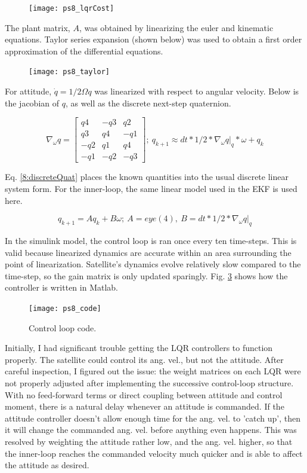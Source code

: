 \documentclass[12pt, letterpaper]{article}
\begin{document}
\begin{figure}[H]
	\centering
	\texttt{[image: ps8\_lqrCost]}
	\label{8:lqrCost}
\end{figure}


The plant matrix, $A$, was obtained by linearizing the euler and kinematic equations. Taylor series expansion (shown below) was used to obtain a first order approximation of the differential equations.

\begin{figure}[H]
	\centering
	\texttt{[image: ps8\_taylor]}
	\label{8:taylor}
\end{figure}

For attitude, $\dot{q} = 1/2\Omega q$ was linearized with respect to angular velocity. Below is the jacobian of $q$, as well as the discrete next-step quaternion.

\[
\nabla_\omega q =
\begin{bmatrix}
q4 &-q3 &q2 \\
q3 &q4 &-q1 \\
-q2 &q1 &q4 \\
-q1 &-q2 &-q3
\end{bmatrix}
;\ q_{k+1} \approx dt*1/2*\nabla_\omega q|_q*\omega + q_k
\]

Eq. \ref{8:discreteQuat} places the known quantities into the usual discrete linear system form. For the inner-loop, the same linear model used in the EKF is used here.

\begin{equation}
q_{k+1} = A q_k + B \omega;\ A = eye(4),\ B = dt*1/2*\nabla_\omega q|_q
\label{8:discreteQuat}
\end{equation}

In the simulink model, the control loop is ran once every ten time-steps. This is valid because linearized dynamics are accurate within an area surrounding the point of linearization. Satellite's dynamics evolve relatively slow compared to the time-step, so the gain matrix is only updated sparingly. Fig. \ref{8:code} shows how the controller is written in Matlab.


\begin{figure}[H]
	\centering
	\texttt{[image: ps8\_code]}
	\caption{Control loop code.}
	\label{8:code}
\end{figure}


Initially, I had significant trouble getting the LQR controllers to function properly. The satellite could control its ang. vel., but not the attitude. After careful inspection, I figured out the issue: the weight matrices on each LQR were not properly adjusted after implementing the successive control-loop structure. With no feed-forward terms or direct coupling between attitude and control moment, there is a natural delay whenever an attitude is commanded. If the attitude controller doesn't allow enough time for the ang. vel. to 'catch up', then it will change the commanded ang. vel. before anything even happens. This was resolved by weighting the attitude rather low, and the ang. vel. higher, so that the inner-loop reaches the commanded velocity much quicker and is able to affect the attitude as desired.
\end{document}
